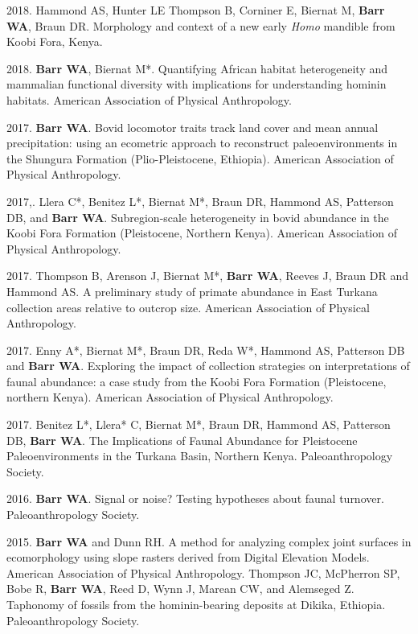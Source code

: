 \documentclass{article}
\begin{document}
\begin{etaremune}
\item 2018. Hammond AS, Hunter LE Thompson B, Corniner E, Biernat M, {\bfseries Barr WA}, Braun DR. Morphology and context of a new early \emph{Homo} mandible from Koobi Fora, Kenya.

\item 2018. {\bfseries Barr WA}, Biernat M*. Quantifying African habitat heterogeneity and mammalian functional diversity with implications for understanding hominin habitats. American Association of Physical Anthropology.


\item 2017. {\bfseries Barr WA}. Bovid locomotor traits track land cover and mean annual precipitation: using an ecometric approach to reconstruct paleoenvironments in the Shungura Formation (Plio-Pleistocene, Ethiopia). American Association of Physical Anthropology.

\item 2017,. Llera C*, Benitez L*, Biernat M*, Braun DR,  Hammond AS, Patterson DB, and {\bfseries Barr WA}. Subregion-scale heterogeneity in bovid abundance in the Koobi Fora Formation (Pleistocene, Northern Kenya).  American Association of Physical Anthropology.

\item 2017. Thompson B, Arenson J, Biernat M*,  {\bfseries Barr WA}, Reeves J, Braun DR and Hammond AS. A preliminary study of primate abundance in East Turkana collection areas relative to outcrop size. American Association of Physical Anthropology.

\item 2017. Enny A*, Biernat M*, Braun DR, Reda W*, Hammond AS, Patterson DB and {\bfseries Barr WA}. Exploring the impact of collection strategies on interpretations of faunal abundance: a case study from the Koobi Fora Formation (Pleistocene, northern Kenya). American Association of Physical Anthropology.

\item 2017. Benitez L*, Llera* C, Biernat M*, Braun DR, Hammond AS, Patterson DB, {\bfseries Barr WA}. The Implications of Faunal Abundance for Pleistocene Paleoenvironments in the Turkana Basin, Northern Kenya. Paleoanthropology Society. 


\item 2016. {\bfseries Barr WA}. Signal or noise? Testing hypotheses about faunal turnover. Paleoanthropology Society. 


\item 2015. {\bfseries Barr WA} and Dunn RH. A method for analyzing complex joint surfaces in ecomorphology using slope rasters derived from Digital Elevation Models. American Association of Physical Anthropology.
Thompson JC, McPherron SP, Bobe R, {\bfseries Barr WA}, Reed D, Wynn J, Marean CW, and Alemseged Z. Taphonomy of fossils from the hominin-bearing deposits at Dikika, Ethiopia. Paleoanthropology Society.



\end{etaremune}
\end{document}
